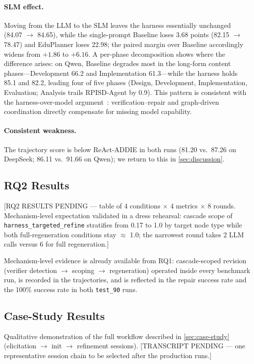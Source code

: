 \paragraph{SLM effect.}
Moving from the LLM to the SLM leaves the harness essentially unchanged (84.07 $\rightarrow$ 84.65), while the single-prompt Baseline loses 3.68 points (82.15 $\rightarrow$ 78.47) and EduPlanner loses 22.98; the paired margin over Baseline accordingly widens from $+1.86$ to $+6.16$. A per-phase decomposition shows where the difference arises: on Qwen, Baseline degrades most in the long-form content phases---Development 66.2 and Implementation 61.3---while the harness holds 85.1 and 82.2, leading four of five phases (Design, Development, Implementation, Evaluation; Analysis trails RPISD-Agent by 0.9). This pattern is consistent with the harness-over-model argument~\cite{cho2026harness}: verification--repair and graph-driven coordination directly compensate for missing model capability.

\paragraph{Consistent weakness.}
The trajectory score is below ReAct-ADDIE in both runs (81.20 vs.\ 87.26 on DeepSeek; 86.11 vs.\ 91.66 on Qwen); we return to this in \cref{sec:discussion}.

\subsection{RQ2 Results}
\label{sec:rq2-results}

[RQ2 RESULTS PENDING --- table of 4 conditions $\times$ 4 metrics $\times$ 8 rounds. Mechanism-level expectation validated in a dress rehearsal: cascade scope of \texttt{harness\_targeted\_refine} stratifies from 0.17 to 1.0 by target node type while both full-regeneration conditions stay $\approx$ 1.0; the narrowest round takes 2 LLM calls versus 6 for full regeneration.]

Mechanism-level evidence is already available from RQ1: cascade-scoped revision (verifier detection $\rightarrow$ scoping $\rightarrow$ regeneration) operated inside every benchmark run, is recorded in the trajectories, and is reflected in the repair success rate and the 100\% success rate in both \texttt{test\_90} runs.

\subsection{Case-Study Results}
\label{sec:case-study-results}

Qualitative demonstration of the full workflow described in \cref{sec:case-study} (elicitation $\rightarrow$ init $\rightarrow$ refinement sessions). [TRANSCRIPT PENDING --- one representative session chain to be selected after the production runs.]
